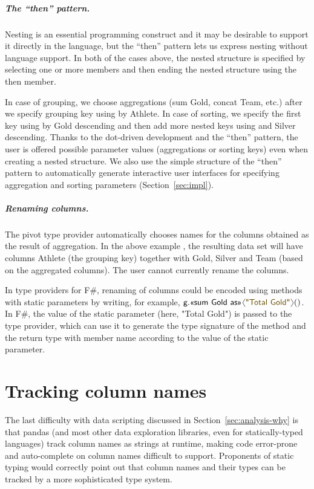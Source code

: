 \documentclass[a4paper,UKenglish]{lipics-v2016}
\theoremstyle{plain}
\theoremstyle{definition}
\newcommand{\langl}{\begin{picture}(4.5,7)
\put(1.1,2.5){\rotatebox{60}{\line(1,0){5.5}}}
\put(1.1,2.5){\rotatebox{300}{\line(1,0){5.5}}}
\end{picture}}
\newcommand{\rangl}{\begin{picture}(4.5,7)
\put(.9,2.5){\rotatebox{120}{\line(1,0){5.5}}}
\put(.9,2.5){\rotatebox{240}{\line(1,0){5.5}}}
\end{picture}}
\newcommand{\ball}[1]{\FPeval{\result}{clip(201+#1)}\textnormal{\ding{\result}}}
\newcommand{\str}[1]{\textnormal{\textcolor{strclr}{\sffamily "#1"}}}
\newcommand{\ident}[1]{\textnormal{\sffamily #1}}
\newcommand{\qident}[1]{\textnormal{\sffamily \guillemotleft #1\guillemotright}}
\begin{document}
\subparagraph{The ``then'' pattern.}
Nesting is an essential programming construct and it may be desirable to support it directly in 
the language, but the ``then'' pattern lets us express nesting without language support. In both 
of the cases above, the nested structure is specified by selecting one or more members and then 
ending the nested structure using the \ident{then} member.

In case of grouping, we choose aggregations (\qident{sum Gold}, \qident{concat Team}, etc.) after 
we specify grouping key using \qident{by Athlete}. In case of sorting, we specify the first key
using \qident{by Gold descending} and then add more nested keys using \qident{and Silver descending}.
Thanks to the dot-driven development and the ``then'' pattern, the user is offered possible 
parameter values (aggregations or sorting keys) even when creating a nested structure. We also use
the simple structure of the ``then'' pattern to automatically generate interactive user
interfaces for specifying aggregation and sorting parameters (Section~\ref{sec:impl}).

\subparagraph{Renaming columns.}
The pivot type provider automatically chooses names for the columns obtained as the result of
aggregation. In the above example \ball{1}, the resulting data set will have columns Athlete
(the grouping key) together with Gold, Silver and Team (based on the aggregated columns).
The user cannot currently rename the columns.

In type providers for F\#, renaming of columns could be encoded using methods with static parameters \cite{staticpar} by writing, 
for example, $\ident{g}.\qident{sum Gold as}\langl\str{Total Gold}\rangl()$. In F\#, the value of 
the static parameter (here, \str{Total Gold}) is passed to the type provider, which can use it to
generate the type signature of the method and the return type with member name according to the
value of the static parameter.


\section{Tracking column names}
\label{sec:columns}

The last difficulty with data scripting discussed in Section~\ref{sec:analysis-why} is that pandas 
(and most other data exploration libraries, even for statically-typed languages) track column names as 
strings at runtime, making code error-prone and auto-complete on column names difficult to support.
Proponents of static typing would correctly point out that column names and their types can be
tracked by a more sophisticated type system. 
\end{document}
